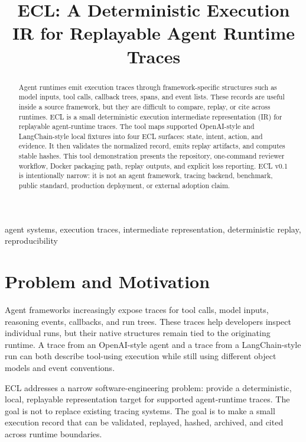 \documentclass[10pt,conference]{IEEEtran}
\title{ECL: A Deterministic Execution IR for Replayable Agent Runtime Traces}
\author{
\IEEEauthorblockN{Bin Zhang}
\IEEEauthorblockA{Independent Researcher\\
Email: joy7759@gmail.com}
}
\begin{document}
\maketitle

\begin{abstract}
Agent runtimes emit execution traces through framework-specific structures such as model inputs, tool calls, callback trees, spans, and event lists. These records are useful inside a source framework, but they are difficult to compare, replay, or cite across runtimes. ECL is a small deterministic execution intermediate representation (IR) for replayable agent-runtime traces. The tool maps supported OpenAI-style and LangChain-style local fixtures into four ECL surfaces: state, intent, action, and evidence. It then validates the normalized record, emits replay artifacts, and computes stable hashes. This tool demonstration presents the repository, one-command reviewer workflow, Docker packaging path, replay outputs, and explicit loss reporting. ECL v0.1 is intentionally narrow: it is not an agent framework, tracing backend, benchmark, public standard, production deployment, or external adoption claim.
\end{abstract}

\begin{IEEEkeywords}
agent systems, execution traces, intermediate representation, deterministic replay, reproducibility
\end{IEEEkeywords}

\section{Problem and Motivation}

Agent frameworks increasingly expose traces for tool calls, model inputs, reasoning events, callbacks, and run trees. These traces help developers inspect individual runs, but their native structures remain tied to the originating runtime. A trace from an OpenAI-style agent and a trace from a LangChain-style run can both describe tool-using execution while still using different object models and event conventions.

ECL addresses a narrow software-engineering problem: provide a deterministic, local, replayable representation target for supported agent-runtime traces. The goal is not to replace existing tracing systems. The goal is to make a small execution record that can be validated, replayed, hashed, archived, and cited across runtime boundaries.
\end{document}
